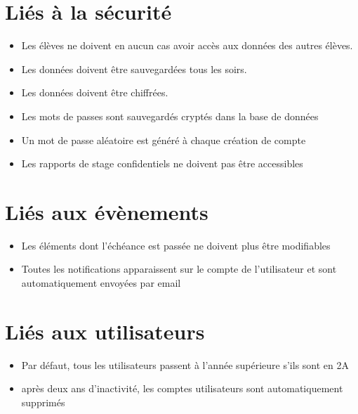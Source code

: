 \documentclass{scrreprt}
\begin{document}
\section{Li\'es \`a la s\'ecurit\'e}
\begin{itemize}
\item Les \'el\`eves ne doivent en aucun cas avoir acc\`es aux donn\'ees des autres \'el\`eves.
\item Les donn\'ees doivent \^etre sauvegard\'ees tous les soirs.
\item Les donn\'ees doivent \^etre chiffr\'ees.
\item Les mots de passes sont sauvegard\'es crypt\'es dans la base de donn\'ees
\item Un mot de passe al\'eatoire est g\'en\'er\'e \`a chaque cr\'eation de compte
\item Les rapports de stage confidentiels ne doivent pas \^etre accessibles
\end{itemize}

\section{Li\'es aux \'ev\`enements}
\begin{itemize}
\item Les \'el\'ements dont l’\'ech\'eance est pass\'ee ne doivent plus \^etre modifiables
\item Toutes les notifications apparaissent sur le compte de l’utilisateur et sont automatiquement envoy\'ees par email
\end{itemize}

\section{Li\'es aux utilisateurs}
\begin{itemize}
\item Par d\'efaut, tous les utilisateurs passent \`a l’ann\'ee sup\'erieure s’ils sont en 2A
\item apr\`es deux ans d’inactivit\'e, les comptes utilisateurs sont automatiquement supprim\'es
\end{itemize}

\newpage
\end{document}
